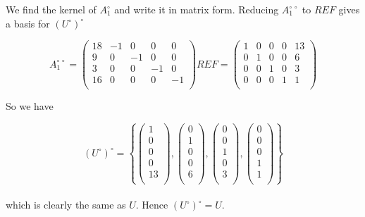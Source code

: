 \documentclass[14pt]{extarticle}
\begin{document}
We find the kernel of $A_1^{\circ}$ and write it in matrix form. Reducing $A_1^{\circ \, \circ}$ to $REF$ gives a basis for $(U^{\circ})^{\circ}$
 
\[
A_1^{\circ \, \circ} = \begin{pmatrix} 
 18 & -1 &  0 &  0 &  0 \\ 
  9 &  0 & -1 &  0 &  0 \\ 
  3 &  0 &  0 & -1 &  0 \\ 
 16 &  0 &  0 &  0 & -1 \\ 
\end{pmatrix} 
REF = \begin{pmatrix} 
  1 &  0 &  0 &  0 & 13 \\ 
  0 &  1 &  0 &  0 &  6 \\ 
  0 &  0 &  1 &  0 &  3 \\ 
  0 &  0 &  0 &  1 &  1 \\ 
\end{pmatrix} 
\]

So we have

\[(U^{\circ})^{\circ} = \left \{
\begin{pmatrix}  1 \\  0 \\  0 \\  0 \\ 13 \\\end{pmatrix}, 
\begin{pmatrix}  0 \\  1 \\  0 \\  0 \\  6 \\\end{pmatrix},
\begin{pmatrix}  0 \\  0 \\  1 \\  0 \\  3 \\\end{pmatrix}, 
\begin{pmatrix}  0 \\  0 \\  0 \\  1 \\  1 \\\end{pmatrix} 
\right \}
\]\\

which is clearly the same as $U$. Hence $(U^{\circ})^{\circ} = U$.\\
\end{document}
